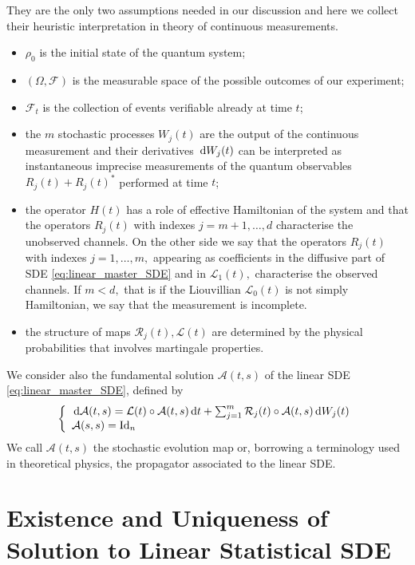 They are the only two assumptions needed in our discussion and here we collect their heuristic interpretation in theory of continuous measurements.
\begin{itemize}
	\item $\rho_{0}$ is the initial state of the quantum system;
	\item $(\Omega, \mathcal{F})$ is the measurable space of the possible outcomes of our experiment;
	\item $\mathcal{F}_{t}$ is the collection of events verifiable already at time $t$;
	\item the $m$ stochastic processes $W_{j}(t)$ are the output of the continuous measurement and their derivatives $\,\mathrm{d}{W}_{j}(t)$ can be interpreted as instantaneous imprecise measurements of the quantum observables $R_{j}(t)+R_{j}(t)^{*}$ performed at time $t$;
	\item the operator $H(t)$ has a role of effective Hamiltonian of the system and that the operators $R_{j}(t)$ with indexes $j=m+1, \ldots, d$ characterise the unobserved channels. On the other side we say that the operators $R_{j}(t)$ with indexes $j=1, \ldots, m,$ appearing as coefficients in the diffusive part of SDE \eqref{eq:linear_master_SDE} and in $\mathcal{L}_{1}(t),$ characterise the observed channels. If $m<d,$ that is if the Liouvillian $\mathcal{L}_{0}(t)$ is not simply Hamiltonian, we say that the measurement is incomplete.
	\item the structure of maps $\mathcal{R}_{j}(t), \mathcal{L}(t)$ are determined by the physical probabilities that involves martingale properties.
\end{itemize}

We consider also the fundamental solution $\mathcal{A}(t, s)$ of the linear SDE \eqref{eq:linear_master_SDE}, defined by
\begin{equation}
	\left\{\begin{array}{l}\,\mathrm{d} \mathcal{A}(t, s)=\mathcal{L}(t) \circ \mathcal{A}(t, s) \,\mathrm{d} t+\sum_{j=1}^{m} \mathcal{R}_{j}(t) \circ \mathcal{A}(t, s) \,\mathrm{d} W_{j}(t) \\ \mathcal{A}(s, s)=\mathrm{Id}_{n}\end{array}\right.
	\label{eq:linear_master_SDEfundamental}
\end{equation}
 We call $\mathcal{A}(t, s)$ the stochastic evolution map or, borrowing a terminology used in theoretical physics, the propagator associated to the linear SDE.


\section{Existence and Uniqueness of Solution to Linear Statistical SDE}


